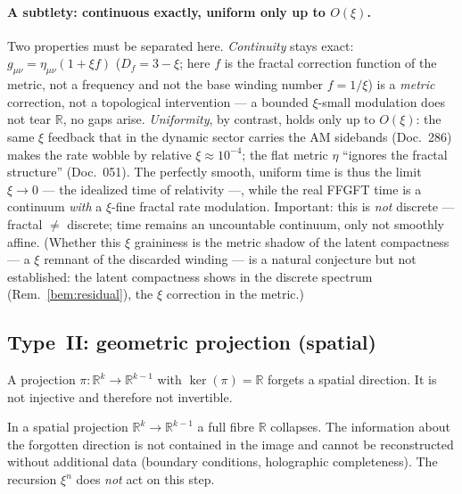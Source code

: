 \paragraph{A subtlety: continuous exactly, uniform only up to $O(\xi)$.} Two properties must
be separated here. \emph{Continuity} stays exact: $g_{\mu\nu}=\eta_{\mu\nu}(1+\xi f)$
($D_f=3-\xi$; here $f$ is the fractal correction function of the metric, not a frequency
and not the base winding number $f=1/\xi$) is a \emph{metric} correction, not a topological intervention --- a bounded
$\xi$-small modulation does not tear $\mathbb{R}$, no gaps arise. \emph{Uniformity}, by
contrast, holds only up to $O(\xi)$: the same $\xi$ feedback that in the dynamic sector
carries the AM sidebands (Doc.~286) makes the rate wobble by relative $\xi\approx10^{-4}$; the
flat metric $\eta$ ``ignores the fractal structure'' (Doc.~051). The perfectly smooth, uniform
time is thus the limit $\xi\to0$ --- the idealized time of relativity ---, while the real
FFGFT time is a continuum \emph{with} a $\xi$-fine fractal rate modulation. Important: this is
\emph{not} discrete --- fractal $\neq$ discrete; time remains an uncountable continuum, only
not smoothly affine. (Whether this $\xi$ graininess is the metric shadow of the latent
compactness --- a $\xi$ remnant of the discarded winding --- is a natural conjecture but not
established: the latent compactness shows in the discrete spectrum (Rem.~\ref{bem:residual}),
the $\xi$ correction in the metric.)

\subsection{Type~II: geometric projection (spatial)}

\begin{definition}\label{def:typeII}
A projection $\pi:\mathbb{R}^{k}\to\mathbb{R}^{k-1}$ with $\ker(\pi)=\mathbb{R}$
forgets a spatial direction. It is not injective and therefore not invertible.
\end{definition}

\begin{theorem}\label{satz:typeII}
In a spatial projection $\mathbb{R}^k \to \mathbb{R}^{k-1}$ a full fibre
$\mathbb{R}$ collapses. The information about the forgotten direction is not
contained in the image and cannot be reconstructed without additional data
(boundary conditions, holographic completeness). The recursion $\xi^n$ does
\emph{not} act on this step.
\end{theorem}

